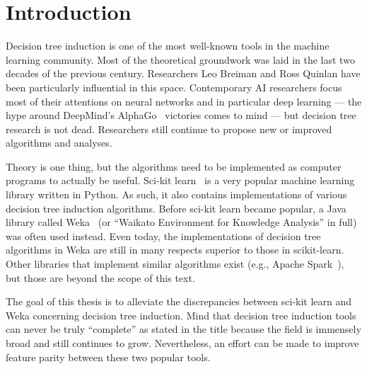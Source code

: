 
\chapter{Introduction}\label{cha:intro}


Decision tree induction is one of the most well-known tools in the machine learning community. Most of the theoretical groundwork was laid in the last two decades of the previous century. Researchers Leo Breiman and Ross Quinlan have been particularly influential in this space. Contemporary AI researchers focus most of their attentions on neural networks and in particular deep learning --- the hype around DeepMind's AlphaGo~\cite{alphago} victories comes to mind --- but decision tree research is not dead. Researchers still continue to propose new or improved algorithms and analyses.

Theory is one thing, but the algorithms need to be implemented as computer programs to actually be useful. Sci-kit learn~\cite{scikit-learn} is a very popular machine learning library written in Python. As such, it also contains implementations of various decision tree induction algorithms. Before sci-kit learn became popular, a Java library called Weka~\cite{eibe2016weka} (or ``Waikato Environment for Knowledge Analysis'' in full) was often used instead. Even today, the implementations of decision tree algorithms in Weka are still in many respects superior to those in scikit-learn. Other libraries that implement similar algorithms exist (e.g., Apache Spark~\cite{spark}), but those are beyond the scope of this text.

The goal of this thesis is to alleviate the discrepancies between sci-kit learn and Weka concerning decision tree induction. Mind that decision tree induction tools can never be truly ``complete'' as stated in the title because the field is immensely broad and still continues to grow. Nevertheless, an effort can be made to improve feature parity between these two popular tools.

